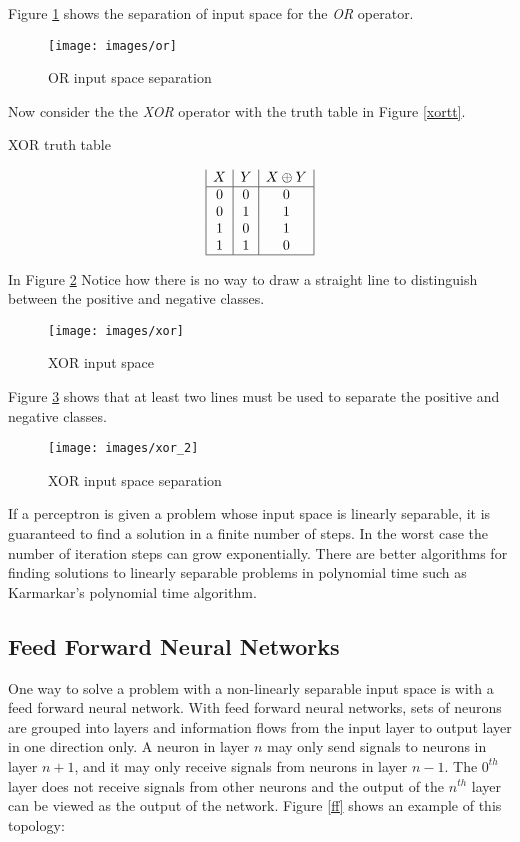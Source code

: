 Figure \ref{ors} shows the separation of input space for the {\it OR} operator.

\begin{figure}[h!]
  \centering
  \texttt{[image: images/or]}
  \caption{OR input space separation}
  \label{ors}
\end{figure}

Now consider the the {\it XOR} operator with the truth table in Figure \ref{xortt}.
\begin{table}[h!]
\caption{XOR truth table}
\label{xortt}
\begin{displaymath}
\begin{array}{|c|c|c|}
   X
 & Y
 & X \oplus Y
\\
\hline
0 & 0 & 0\\
0 & 1 & 1\\
1 & 0 & 1\\
1 & 1 & 0\\
\hline
\end{array}
\end{displaymath}
\end{table}

In Figure \ref{xors} Notice how there is no way to draw a straight line to distinguish between the positive and negative classes.

\begin{figure}[h!]
  \centering
  \texttt{[image: images/xor]}
  \caption{XOR input space}
  \label{xors}
\end{figure}

Figure \ref{xorss} shows that at least two lines must be used to separate the positive and negative classes.

\begin{figure}[h!]
  \centering
  \texttt{[image: images/xor\_2]}
  \caption{XOR input space separation}
  \label{xorss}
\end{figure}

If a perceptron is given a problem whose input space is linearly
separable, it is guaranteed to find a solution in a finite number of
steps\cite{patternRecognition1}. 
In the worst case the number of iteration steps can grow
exponentially\cite{rojas2}.
There are better algorithms for finding solutions to linearly separable problems in
polynomial time such as Karmarkar's polynomial time
algorithm\cite{karmarkar}.

\subsection{Feed Forward Neural Networks} 
One way to solve a problem with a non-linearly separable input space
is with a feed forward neural network.
With feed forward neural networks, sets of neurons are grouped into
layers and information flows from the input layer to output layer in one direction only.
A neuron in layer $n$ may only send signals to neurons in layer $n+1$, and it may only receive signals from neurons in layer $n-1$.
The $0^{th}$ layer does not receive signals from other neurons and the output of the $n^{th}$ layer can be viewed as the output of the network.
Figure \ref{ff} shows an example of this topology:

